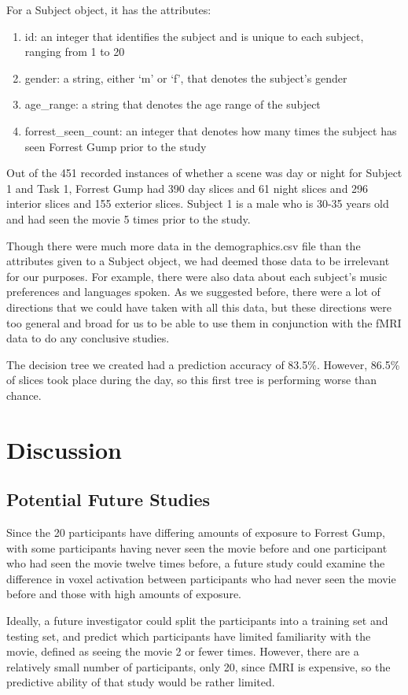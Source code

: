 \documentclass[11pt]{article}
\begin{document}
For a Subject object, it has the attributes:

\begin{enumerate}
\item id: an integer that identifies the subject and is unique to each
subject, ranging from 1 to 20
\item gender: a string, either ‘m’ or ‘f’, that denotes the subject’s gender
\item age\_range: a string that denotes the age range of the subject
\item forrest\_seen\_count: an integer that denotes how many times the subject
has seen Forrest Gump prior to the study
\end{enumerate}

Out of the 451 recorded instances of whether a scene was day or night for
Subject 1 and Task 1, Forrest Gump had 390 day slices and 61 night slices and
296 interior slices and 155 exterior slices. Subject 1 is a male who is 30-35
years old and had seen the movie 5 times prior to the study.

Though there were much more data in the demographics.csv file than the
attributes given to a Subject object, we had deemed those data to be
irrelevant for our purposes. For example, there were also data about each
subject’s music preferences and languages spoken. As we suggested before,
there were a lot of directions that we could have taken with all this data,
but these directions were too general and broad for us to be able to use them
in conjunction with the fMRI data to do any conclusive studies.

The decision tree we created had a prediction accuracy of 83.5\%.  However,
86.5\% of slices took place during the day, so this first tree is performing
worse than chance.

\section{Discussion}

\subsection{Potential Future Studies}

Since the 20 participants have differing
amounts of exposure to Forrest Gump, with some participants having never seen
the movie before and one participant who had seen the movie twelve times
before, a future study could examine the difference in voxel activation
between participants who had never seen the movie before and those with high
amounts of exposure.

Ideally, a future investigator could split the participants into a training
set and testing set, and predict which participants have limited familiarity
with the movie, defined as seeing the movie 2 or fewer times.  However, there
are a relatively small number of participants, only 20, since fMRI is
expensive, so the predictive ability of that study would be rather limited.



\end{document}

